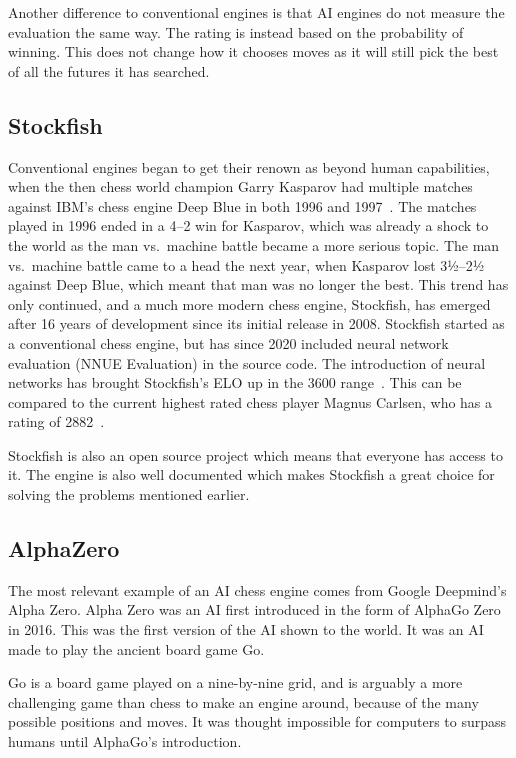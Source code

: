 Another difference to conventional engines is that AI engines do not measure the evaluation the same way.
The rating is instead based on the probability of winning.
This does not change how it chooses moves as it will still pick the best of all the futures it has searched.

\subsection{Stockfish}\label{subsec:stockfish}

Conventional engines began to get their renown as beyond human capabilities, when the then chess world champion
Garry Kasparov had multiple matches against IBM's chess engine Deep Blue in both 1996 and
1997~\cite{Garry-Kasparov-vs-Deep-Blue}.
The matches played in 1996 ended in a 4--2 win for Kasparov, which was already a shock to the world as the man vs.\
machine battle became a more serious topic.
The man vs.\ machine battle came to a head the next year, when Kasparov lost 3½--2½ against Deep Blue, which meant that
man was no longer the best.
This trend has only continued, and a much more modern chess engine, Stockfish, has emerged after 16 years of development
since its initial release in 2008.
Stockfish started as a conventional chess engine, but has since 2020 included neural network
evaluation (NNUE Evaluation) in the source code.
The introduction of neural networks has brought Stockfish's ELO up in the 3600 range~\cite{Stockfish}.
This can be compared to the current highest rated chess player Magnus Carlsen, who has a
rating of 2882~\cite{highest-ELO-chess-player}.

Stockfish is also an open source project which means that everyone has access to it.
The engine is also well documented which makes Stockfish a great choice for solving the problems mentioned earlier.

\subsection{AlphaZero}\label{subsec:alphazero}

The most relevant example of an AI chess engine comes from Google Deepmind's Alpha Zero.
Alpha Zero was an AI first introduced in the form of AlphaGo Zero in 2016.
This was the first version of the AI shown to the world.
It was an AI made to play the ancient board game Go.

Go is a board game played on a nine-by-nine grid, and is arguably a more challenging game than chess to make an engine
around, because of the many possible positions and moves.
It was thought impossible for computers to surpass humans until AlphaGo's introduction.

